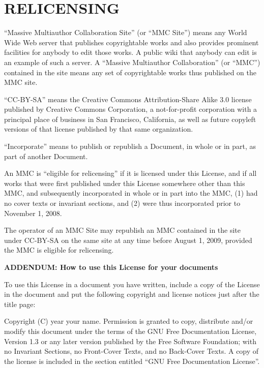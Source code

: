 \section{RELICENSING}

“Massive Multiauthor Collaboration Site” (or “MMC
Site”) means any World Wide Web server that publishes
copyrightable works and also provides prominent facilities for
anybody to edit those works. A public wiki that anybody can
edit is an example of such a server. A “Massive Multiauthor
Collaboration” (or “MMC”) contained in the site means
any set of copyrightable works thus published on the MMC site.

“CC-BY-SA” means the Creative Commons Attribution-Share
Alike 3.0 license published by Creative Commons Corporation, a
not-for-profit corporation with a principal place of business
in San Francisco, California, as well as future copyleft
versions of that license published by that same organization.

“Incorporate” means to publish or republish a Document,
in whole or in part, as part of another Document.

An MMC is “eligible for relicensing” if it is licensed
under this License, and if all works that were first
published under this License somewhere other than this MMC,
and subsequently incorporated in whole or in part into the
MMC, (1) had no cover texts or invariant sections, and (2)
were thus incorporated prior to November 1, 2008.

The operator of an MMC Site may republish an MMC contained in
the site under CC-BY-SA on the same site at any time before
August 1, 2009, provided the MMC is eligible for relicensing.


\textbf{ADDENDUM: How to use this License for your documents}

To use this License in a document you have written, include
a copy of the License in the document and put the following
copyright and license notices just after the title page:

\begin{myindentpara}{2cm}
Copyright (C)  year  your name.
Permission is granted to copy, distribute and/or modify this document
under the terms of the GNU Free Documentation License, Version 1.3
or any later version published by the Free Software Foundation;
with no Invariant Sections, no Front-Cover Texts, and no Back-Cover
Texts.  A copy of the license is included in the section entitled ``GNU
Free Documentation License''.
\end{myindentpara}

